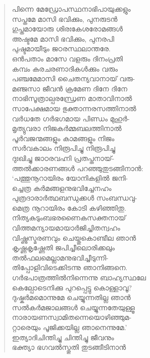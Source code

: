 \begin{verse}
പിന്നെ മേഡ്രോപസ്ഥനാഭിപായുക്കളും\\
സപ്തമേ മാസി ഭവിക്കും, പുനരുടന്‍\\
ഗുപ്തമായോരു ശിരഃകേശരോമങ്ങള്‍\\
അഷ്ടമേ മാസി ഭവിക്കും, പുനരപി\\
പുഷ്ടമായീടും ജഠരസ്ഥലാന്തരേ.\\
ഒന്‍പതാം മാസേ വളരും ദിനംപ്രതി\\
കമ്പം കരചരണാദികള്‍ക്കും വരും\\
പഞ്ചമേമാസി ചൈതന്യവാനായ് വരു-\\
മഞ്ജസാ ജീവന്‍ ക്രമേണ ദിനേ ദിനേ\\
നാഭിസൂത്രാല്പരന്ധ്രേണ മാതാവിനാല്‍\\
സാപേക്ഷമായ ഭുക്താന്നരസത്തിനാല്‍\\
വര്‍ധതേ ഗര്‍ഭഗമായ പിണ്ഡം മുഹുര്‍-\\
മൃത്യുവരാ നിജകര്‍മ്മബലത്തിനാല്‍\\
പൂര്‍വജന്മങ്ങളും കാമങ്ങളും നിജം\\
സര്‍വകാലം നിരൂപിച്ചു നിരൂപിച്ചു\\
ദുഃഖിച്ചു ജാഠരവഹ്നി പ്രതപ്തനായ്-\\
ത്തല്‍ക്കാരണങ്ങള്‍ പറഞ്ഞുതുടങ്ങിനാന്‍:\\
‘പത്തുനൂറായിരം യോനികളില്‍ ജനി-\\
ച്ചെത്ര കര്‍മങ്ങളനുഭവിച്ചേനഹം\\
പുത്രദാരാര്‍ത്ഥബന്ധുക്കള്‍ സംബന്ധവു-\\
മെത്ര നൂറായിരം കോടി കഴിഞ്ഞിതു.\\
നിത്യകുടുംബഭരണൈകസക്തനായ്\\
വിത്തമന്യായമായാര്‍ജിച്ചിതന്വഹം\\
വിഷ്ണുസ്മരണവും ചെയ്തുകൊണ്ടീല ഞാന്‍\\
കൃഷ്ണകൃഷ്ണേതി ജപിച്ചീലൊരിക്കലും\\
തല്‍ഫലമെല്ലാമനുഭവിച്ചീടുന്നി-\\
തിപ്പോളിവിടെക്കിടന്നു ഞാനിങ്ങനെ.\\
ഗര്‍ഭപാത്രത്തില്‍നിന്നെന്നു ബാഹ്യസ്ഥലേ\\
കെല്പോടെനിക്കു പുറപ്പെട്ടു കൊള്ളാവൂ?\\
ദുഷ്കര്‍മമൊന്നുമേ ചെയ്യുന്നതില്ല ഞാന്‍\\
സല്‍കര്‍മജാലങ്ങള്‍ ചെയ്യുന്നതേയുള്ളൂ\\
നാരായണസ്വാമിതന്നെയൊഴിഞ്ഞുമ-\\
റ്റാരെയും പൂജിക്കയില്ല ഞാനെന്നുമേ.’\\
ഇത്യാദിചിന്തിച്ചു ചിന്തിച്ചു ജീവനും\\
ഭക്ത്യാ ഭഗവല്‍സ്തുതി തുടങ്ങീടിനാന്‍\\

\end{verse}
